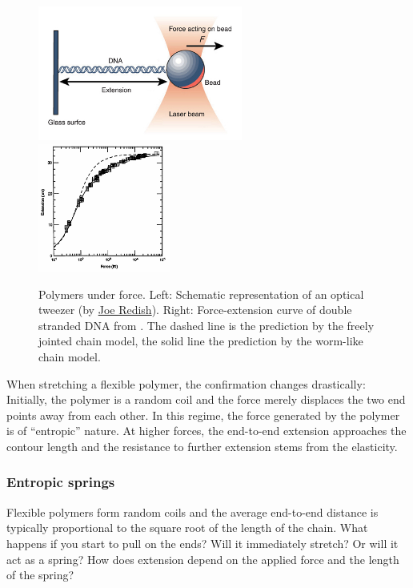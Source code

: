 \begin{figure}[tb]
	\centering
	\includegraphics[width=0.6\textwidth]{figures/OpticalTweezers_DNA.png}
	\includegraphics[width=0.39\textwidth]{figures/DNA_force_extension.png}
	\caption{Polymers under force. Left: Schematic representation of an optical tweezer (by \href{http://umdberg.pbworks.com/w/page/47555271}{Joe Redish}). Right: Force-extension curve of double stranded DNA from \cite{bustamante_entropic_1994}.
	The dashed line is the prediction by the freely jointed chain model, the solid line the prediction by the worm-like chain model.}
	\label{fig:DNA_stretching}
\end{figure}

When stretching a flexible polymer, the confirmation changes drastically:
Initially, the polymer is a random coil and the force merely displaces the two end points away from each other.
In this regime, the force generated by the polymer is of ``entropic'' nature.
At higher forces, the end-to-end extension approaches the contour length and the resistance to further extension stems from the elasticity.

\subsubsection*{Entropic springs}

Flexible polymers form random coils and the average end-to-end distance is typically proportional to the square root of the length of the chain.
What happens if you start to pull on the ends? Will it immediately stretch? Or will it act as a spring? How does extension depend on the applied force and the length of the spring?

